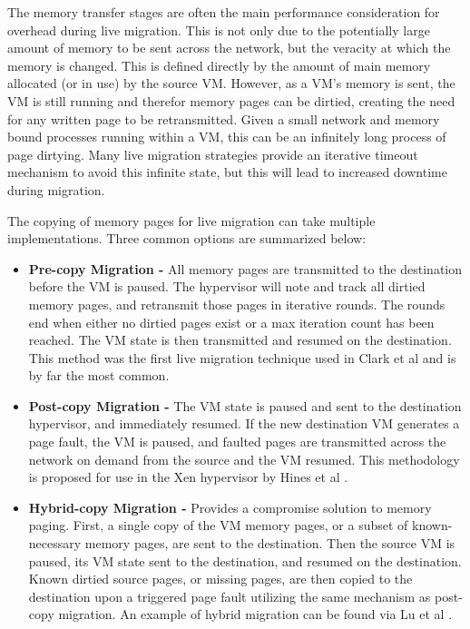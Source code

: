 The memory transfer stages are often the main performance consideration for overhead during live migration. This is not only due to the potentially large amount of memory to be sent across the network, but the veracity at which the memory is changed.  This is defined directly by the amount of main memory allocated (or in use) by the source VM. However, as a VM's memory is sent, the VM is still running and therefor memory pages can be dirtied, creating the need for any written page to be retransmitted. Given a small network and memory bound processes running within a VM, this can be an infinitely long process of page dirtying. Many live migration strategies provide an iterative timeout mechanism to avoid this infinite state, but this will lead to increased downtime during migration.  

The copying of memory pages for live migration can take multiple implementations. Three common options are summarized below:

\begin{itemize}
\item \textbf{Pre-copy Migration - }  All memory pages are transmitted to the destination before the VM is paused. The hypervisor will note and track all dirtied memory pages, and retransmit those pages in iterative rounds. The rounds end when either no dirtied pages exist or a max iteration count has been reached. The VM state is then transmitted and resumed on the destination. This method was the first live migration technique used in Clark et al \cite{clark2005live} and is by far the most common. 
\item \textbf{Post-copy Migration - } The VM state is paused and sent to the destination hypervisor, and immediately resumed. If the new destination VM generates a page fault, the VM is paused, and faulted pages are transmitted across the network on demand from the source and the VM resumed.  This methodology is proposed for use in the Xen hypervisor by Hines et al \cite{hines2009post}. 
\item \textbf{Hybrid-copy Migration - } Provides a compromise solution to memory paging. First, a single copy of the VM memory pages, or a subset of known-necessary memory pages, are sent to the destination.  Then the source VM is paused, its VM state sent to the destination, and resumed on the destination.  Known dirtied source pages, or missing pages, are then copied to the destination upon a triggered page fault utilizing the same mechanism as post-copy migration. An example of hybrid migration can be found via Lu et al \cite{Lu2013}. 
\end{itemize}

